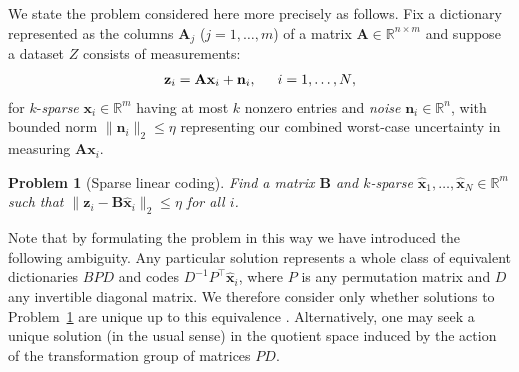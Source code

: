 \documentclass[9pt,twocolumn]{pnas-new}
\newtheorem{problem}{Problem}
\begin{document}
We state the problem considered here more precisely as follows. Fix a dictionary represented as the columns $\mathbf{A}_j$ ($j = 1,\ldots,m$) of a matrix $\mathbf{A} \in \mathbb R^{n \times m}$ and suppose a dataset $Z$ consists of measurements:
\begin{align}\label{LinearModel}
\mathbf{z}_i = \mathbf{A}\mathbf{x}_i + \mathbf{n}_i,\indent \text{$i=1,\ldots,N$},
\end{align}
for $k$-\emph{sparse} $\mathbf{x}_i \in \mathbb{R}^m$ having at most $k$ nonzero entries and \emph{noise} $\mathbf{n}_i \in \mathbb{R}^n$, with bounded norm $\| \mathbf{n}_i \|_2 \leq  \eta$ representing our combined worst-case uncertainty in  measuring $\mathbf{A}\mathbf{x}_i$.

\begin{problem}[Sparse linear coding]\label{InverseProblem}
Find a matrix $\mathbf{B}$ and $k$-sparse $\mathbf{\hat x}_1, \ldots, \mathbf{\hat x}_N \in \mathbb{R}^m$ such that $\|\mathbf{z}_i - \mathbf{B}\mathbf{\hat x}_i\|_2 \leq \eta$ for all $i$.
\end{problem}

Note that by formulating the problem in this way we have introduced the following ambiguity. Any particular solution represents a whole class of equivalent dictionaries $BPD$ and codes $D^{-1}P^{\top}\mathbf{\hat x}_i$, where $P$ is any permutation matrix and $D$ any invertible diagonal matrix. We therefore consider only whether solutions to Problem~\ref{InverseProblem} are unique up to this equivalence \cite{Li15}. Alternatively, one may seek a unique solution (in the usual sense) in the quotient space induced by the action of the transformation group of matrices $PD$.
\end{document}
